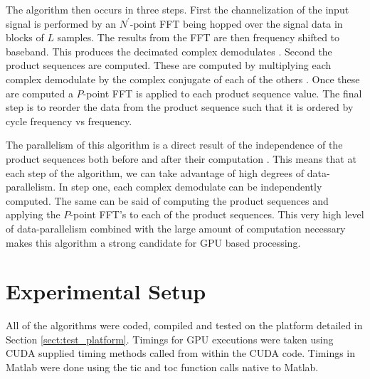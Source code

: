 The algorithm then occurs in three steps.  First the channelization of the input signal is performed by an $N^\prime$-point FFT being hopped over the signal data in blocks of $L$ samples.  The results from the FFT are then frequency shifted to baseband.  This produces the decimated complex demodulates \cite{RobBroLoo91}.  Second the product sequences are computed.  These are computed by multiplying each complex demodulate by the complex conjugate of each of the others \cite{Costa96}.  Once these are computed a $P$-point FFT is applied to each product sequence value.  The final step is to reorder the data from the product sequence such that it is ordered by cycle frequency vs frequency.

The parallelism of this algorithm is a direct result of the independence of the product sequences both before and after their computation \cite{RobBroLoo91}.  This means that at each step of the algorithm, we can take advantage of high degrees of data-parallelism.  In step one, each complex demodulate can be independently computed.  The same can be said of computing the product sequences and applying the $P$-point FFT's to each of the product sequences.  This very high level of data-parallelism combined with the large amount of computation necessary makes this algorithm a strong candidate for GPU based processing.


\section{Experimental Setup}
All of the algorithms were coded, compiled and tested on the platform detailed in Section \ref{sect:test_platform}.  Timings for GPU executions were taken using CUDA supplied timing methods called from within the CUDA code.  Timings in Matlab were done using the tic and toc function calls native to Matlab.

